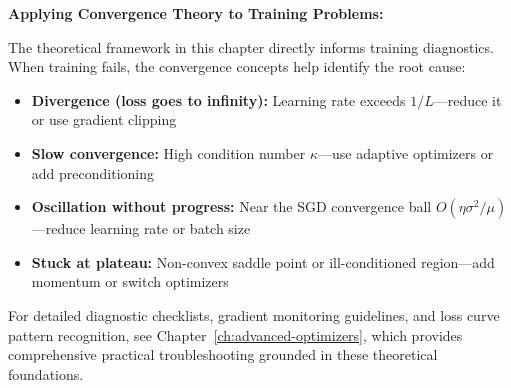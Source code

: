 \documentclass[../../main.tex]{subfiles}
\begin{document}
%

\begin{principle}
\textbf{Applying Convergence Theory to Training Problems:}

The theoretical framework in this chapter directly informs training diagnostics. When training fails, the convergence concepts help identify the root cause:

\begin{itemize}
    \item \textbf{Divergence (loss goes to infinity):} Learning rate exceeds $1/L$---reduce it or use gradient clipping
    \item \textbf{Slow convergence:} High condition number $\kappa$---use adaptive optimizers or add preconditioning
    \item \textbf{Oscillation without progress:} Near the SGD convergence ball $O(\eta\sigma^2/\mu)$---reduce learning rate or batch size
    \item \textbf{Stuck at plateau:} Non-convex saddle point or ill-conditioned region---add momentum or switch optimizers
\end{itemize}

For detailed diagnostic checklists, gradient monitoring guidelines, and loss curve pattern recognition, see Chapter~\ref{ch:advanced-optimizers}, which provides comprehensive practical troubleshooting grounded in these theoretical foundations.
\end{principle}

\iffalse %
\end{document}

